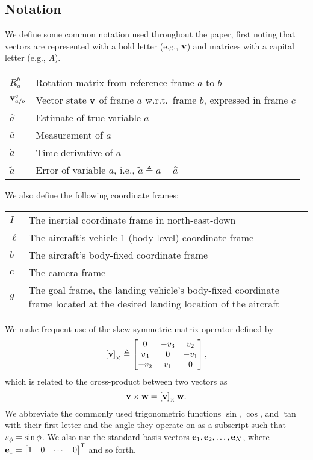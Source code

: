 
\subsection{Notation}

We define some common notation used throughout the paper, first noting that
vectors are represented with a bold letter (e.g., $\bf v$) and matrices with a
capital letter (e.g., $A$).
\begin{center}
\begin{tabularx}{\columnwidth}{lX}
$R_a^b$ & Rotation matrix from reference frame $a$ to $b$ \\
$\boldsymbol{\mathrm{v}}_{a/b}^c$ & Vector state $\boldsymbol{\mathrm{v}}$ of frame $a$ w.r.t.~frame $b$, expressed in frame $c$ \\
$\hat{a}$ & Estimate of true variable $a$ \\
$\bar{a}$ & Measurement of $a$ \\
$\dot{a}$ & Time derivative of $a$ \\
$\tilde{a}$ & Error of variable $a$, i.e., $\tilde{a} \triangleq a - \hat{a}$
\end{tabularx}
\end{center}
%
We also define the following coordinate frames:
\begin{center}
\begin{tabularx}{\columnwidth}{lX}
$I$ & The inertial coordinate frame in north-east-down\\
$\ell$ & The aircraft's vehicle-1 (body-level) coordinate frame \\
$b$ & The aircraft's body-fixed coordinate frame \\
$c$ & The camera frame \\
$g$ & The goal frame, the landing vehicle's body-fixed coordinate frame located at the desired landing location of the aircraft
\end{tabularx}
\end{center}

We make frequent use of the skew-symmetric matrix operator defined by
\begin{equation}
  \left[ \boldsymbol{\mathrm{v}} \right]_{\times} \triangleq
  \begin{bmatrix}
  0 & -v_{3} & v_{2}\\
  v_{3} & 0 & -v_{1}\\
  -v_{2} & v_{1} & 0
  \end{bmatrix},
\end{equation}
which is related to the cross-product between two vectors as
\begin{equation}
  \boldsymbol{\mathrm{v}}\times\boldsymbol{\mathrm{w}}=\left[ \boldsymbol{\mathrm{v}} \right]_{\times}\boldsymbol{\mathrm{w}}.
\end{equation}
We abbreviate the commonly used trigonometric functions $\sin$, $\cos$, and
$\tan$ with their first letter and the angle they operate on as a subscript
such that $s_\phi = \sin\phi$.
We also use the standard basis vectors $\boldsymbol{\mathrm{e}}_1, \boldsymbol{\mathrm{e}}_2, \ldots, \boldsymbol{\mathrm{e}}_N$,
where $\boldsymbol{\mathrm{e}}_1 = \begin{bmatrix} 1 & 0 & \cdots & 0 \end{bmatrix}^{\mathsf{T}}$
and so forth.

